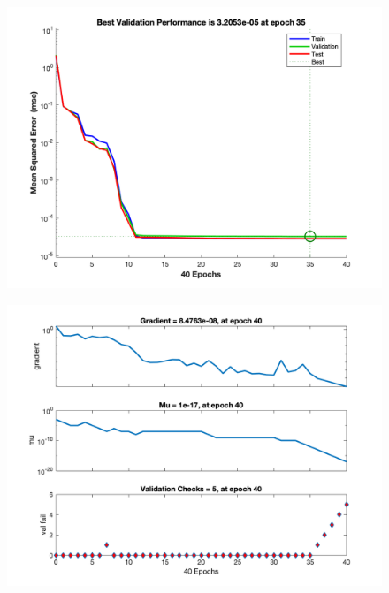 \documentclass[12pt]{article}
\begin{document}
\begin{figure}[h]
	\includegraphics[width=20cm]{Epoch.png}
\end{figure}

\begin{figure}[h]
	\includegraphics[width=20cm]{Training.png}
\end{figure}
\end{document}
